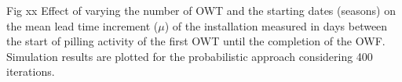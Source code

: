 \label{fig:Seasonaleffect}
Fig xx Effect of varying the number of OWT and the starting dates (seasons) on the mean lead time increment ($\mu$) of the installation measured in days between the start of pilling activity of the first OWT until the completion of the OWF. Simulation results are plotted for the probabilistic approach considering 400 iterations.